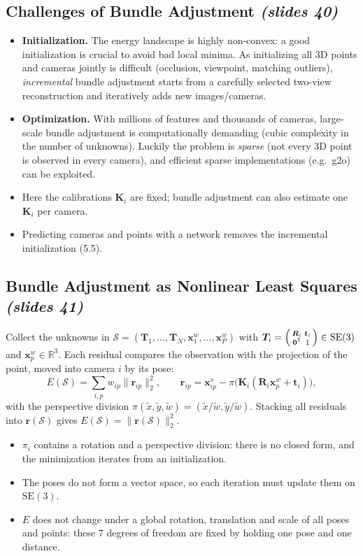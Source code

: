 \documentclass[11pt,a4paper]{article}
\newcommand{\slr}[1]{\texorpdfstring{\emph{(slides #1)}}{(slides #1)}}
\newcommand{\R}{\mathbb{R}}
\newcommand{\SE}{\mathrm{SE}(3)}
\newcommand{\norm}[1]{\lVert #1\rVert}
\newcommand{\tr}{^{\mathsf T}}
\begin{document}
\subsection{Challenges of Bundle Adjustment \slr{40}}
\begin{itemize}
\item \textbf{Initialization.} The energy landscape is highly non-convex: a good initialization is crucial to avoid bad local minima. As initializing all 3D points and cameras jointly is difficult (occlusion, viewpoint, matching outliers), \emph{incremental} bundle adjustment starts from a carefully selected two-view reconstruction and iteratively adds new images/cameras.
\item \textbf{Optimization.} With millions of features and thousands of cameras, large-scale bundle adjustment is computationally demanding (cubic complexity in the number of unknowns). Luckily the problem is \emph{sparse} (not every 3D point is observed in every camera), and efficient sparse implementations (e.g.\ g2o) can be exploited.
\item Here the calibrations $\bm K_i$ are fixed; bundle adjustment can also estimate one $\bm K_i$ per camera.
\item Predicting cameras and points with a network removes the incremental initialization (5.5).
\end{itemize}

\subsection{Bundle Adjustment as Nonlinear Least Squares \slr{41}}
Collect the unknowns in $\mathcal S=(\bm T_1,\dots,\bm T_N,\bm x^w_1,\dots,\bm x^w_P)$ with $\bm T_i=\begin{psmallmatrix}\bm R_i&\bm t_i\\\bm 0\tr&1\end{psmallmatrix}\in\SE$ and $\bm x^w_p\in\R^3$. Each residual compares the observation with the projection of the point, moved into camera $i$ by its pose:
\[
E(\mathcal S)=\sum_{i,p}w_{ip}\norm{\bm r_{ip}}_2^2,\qquad \bm r_{ip}=\bm x^s_{ip}-\pi\bigl(\bm K_i(\bm R_i\bm x^w_p+\bm t_i)\bigr),
\]
with the perspective division $\pi(\tilde x,\tilde y,\tilde w)=(\tilde x/\tilde w,\tilde y/\tilde w)$. Stacking all residuals into $\bm r(\mathcal S)$ gives $E(\mathcal S)=\norm{\bm r(\mathcal S)}_2^2$.
\begin{itemize}
\item $\pi_i$ contains a rotation and a perspective division: there is no closed form, and the minimization iterates from an initialization.
\item The poses do not form a vector space, so each iteration must update them on $\SE$.
\item $E$ does not change under a global rotation, translation and scale of all poses and points: these 7 degrees of freedom are fixed by holding one pose and one distance.
\end{itemize}
\end{document}
